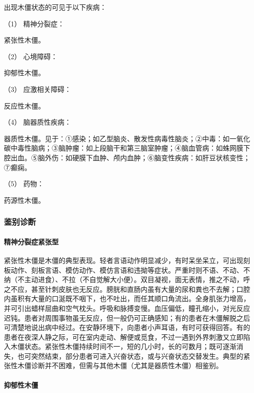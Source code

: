 出现木僵状态的可见于以下疾病：

\hypertarget{text00046.htmlux5cux23CHP1-18-4-1-2-1}{}
（1） 精神分裂症：

紧张性木僵。

\hypertarget{text00046.htmlux5cux23CHP1-18-4-1-2-2}{}
（2） 心境障碍：

抑郁性木僵。

\hypertarget{text00046.htmlux5cux23CHP1-18-4-1-2-3}{}
（3） 应激相关障碍：

反应性木僵。

\hypertarget{text00046.htmlux5cux23CHP1-18-4-1-2-4}{}
（4） 脑器质性疾病：

器质性木僵。见于：①感染；如乙型脑炎、散发性病毒性脑炎；②中毒：如一氧化碳中毒性脑病；③脑肿瘤：如上段脑干和第三脑室肿瘤；④脑血管病：如蛛网膜下腔出血。⑤脑外伤：如硬膜下血肿、颅内血肿；⑥脑变性疾病：如肝豆状核变性；⑦癫痫。

\hypertarget{text00046.htmlux5cux23CHP1-18-4-1-2-5}{}
（5） 药物：

药源性木僵。

\subsubsection{鉴别诊断}

\paragraph{精神分裂症紧张型}

紧张性木僵是木僵的典型表现。轻者言语动作明显减少，有时呆坐呆立，可出现刻板动作、刻板言语、模仿动作、模仿言语和违拗等症状。严重时则不语、不动、不纳（不主动进食）、不拉（不自觉解大小便）。双目凝视，面无表情，推之不动，呼之不应，甚至针刺皮肤也无反应。膀胱和直肠内虽有大量的尿和粪也不去解；口腔内虽积有大量的口涎既不咽下，也不吐出，而任其顺口角流出。全身肌张力增高，并可引出蜡样屈曲和空气枕头。呼吸和脉搏变慢。血压偏低，瞳孔缩小，对光反应迟钝。患者对周围事物虽无反应，但一般仍可正确感知；有的患者在木僵解脱之后可清楚地说出病中经过。在安静环境下，向患者小声耳语，有时可获得回答。有的患者在夜深人静之际，可在室内走动、解便或觅食，不过一遇到外界刺激又立即陷入木僵状态。紧张性木僵持续时间不一，短的几小时，长的可数月；既可逐渐消失，也可突然结束，部分患者可进入兴奋状态，或与兴奋状态交替发生。典型的紧张性木僵诊断并不困难，但需与其他木僵（尤其是器质性木僵）相鉴别。

\paragraph{抑郁性木僵}

